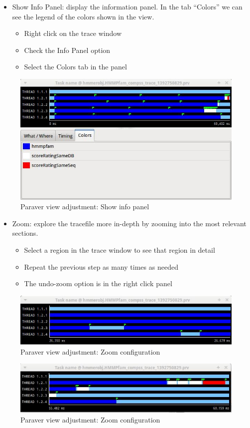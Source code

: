 \begin{itemize}
 \item Show Info Panel: display the information panel. In the tab ``Colors'' we can see the legend of the colors shown in the view.
	\begin{itemize}
	    \item Right click on the trace window
	    \item Check the Info Panel option
	    \item Select the Colors tab in the panel
	\end{itemize}
\end{itemize}

\begin{figure}[ht!]
  \centering
    \includegraphics[width=1.0\textwidth]{./Sections/3_Visualization/Figures/5.jpeg}
    \caption{Paraver view adjustment: Show info panel}
\end{figure}

\begin{itemize}
 \item Zoom: explore the tracefile more in-depth by zooming into the most relevant sections.
	\begin{itemize}
	    \item Select a region in the trace window to see that region in detail
	    \item Repeat the previous step as many times as needed
	    \item The undo-zoom option is in the right click panel
	\end{itemize}
\end{itemize}

\begin{figure}[ht!]
  \centering
    \includegraphics[width=1.0\textwidth]{./Sections/3_Visualization/Figures/6.jpeg}
    \caption{Paraver view adjustment: Zoom configuration}
\end{figure}

\begin{figure}[ht!]
  \centering
    \includegraphics[width=1.0\textwidth]{./Sections/3_Visualization/Figures/6_2.jpeg}
    \caption{Paraver view adjustment: Zoom configuration}
\end{figure}
